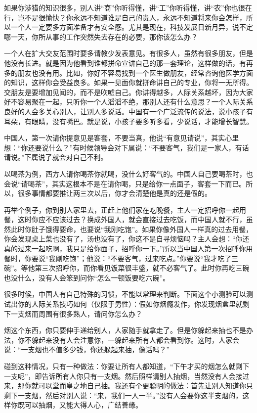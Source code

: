\documentclass[fontset=fandol, a4paper, 12pt, openright]{ctexbook}
\begin{document}
如果你涉猎的知识很多，别人讲“商”你听得懂，讲“工”你听得懂，讲“农”你也很在行，岂不是很愉快？你永远不知道谁是自己的贵人，永远不知道将来你会怎样，所以一个人一定要多方面准备才有安全感。尤其是现在，科技发展日新月异，说不定哪一天，你所从事的工作突然失去存在的必要，那你该怎么办？

一个人在扩大交友范围时要多请教少发表意见。有很多人，虽然有很多朋友，但是他没有长进。就是因为他看到谁都拼命宣讲自己的那一套理论，这样做的话，有再多的朋友也没有用。比如，你好不容易找到一个医生做朋友，经常咨询他医学方面的知识，这样你会受益良多。如果一见面你就拼命讲自己的专业，你将一无所得。交朋友是要增加见闻的，而不是吹嘘自己。你讲得越多，人际关系越坏，因为大家好不容易聚在一起，只听你一个人滔滔不绝，那别人还有什么意思？一个人际关系良好的人会多关心别人，让别人多说话。中国有一个广泛流传的说法，说小孩子有耳朵，有眼睛，没有嘴巴。就是说，小孩子要多听多看，少说话，才能增长智慧。

中国人，第一次请你提意见是客套，不要当真，他说“有意见请说”，其实心里想：“你还要说什么？”有时候领导会对下属说：“不要客气，我们是一家人，有话请说。”下属说了就会对自己不利。

以喝茶为例，西方人请你喝茶你就喝，没什么好客气的。中国人自己要喝茶时，也会说“请喝茶”，其实这根本不是在请你喝，只是给你一点面子，客套一下而已。所以，很多事情都要推让两三次以后，你才会清楚他是真的还是假的。

再举个例子，你到别人家里去，正赶上他们家在吃晚餐，主人一定招呼你一起用餐，这时你应不应该过去？换成外国人，就会直接过去吃饭，而中国人就不行，虽然此时你肚子饿得要命，也要说“我刚吃饱”。如果你像外国人一样真的过去用餐，你会发现桌上菜也没有了，汤也没有了，你这不是自寻烦恼吗？主人会想：“你还真的过来一起吃啊，我只是给你面子，招呼你一下。”所以当中国人第一次招呼你用餐时，你要说“我刚吃饱”；他说：“不要客气，过来吃点。”你要说“我才吃了三碗”。等他第三次招呼你，而你看见饭菜很丰盛，就不必客气了。此时你再吃三碗也没什么，没有人会笨到问你“怎么一顿饭要吃六碗”。

很多时候，中国人有自己特殊的习惯，不能以常理来判断。下面这个小测验可以测试出你的人际关系技巧如何（仅限于男性）：假如你烟瘾发作，你发现烟盒里就剩下一支烟而周围有很多熟人，请问你怎么办？

烟这个东西，你只要伸手递给别人，人家随手就拿走了。但是你躲起来抽也不是办法，你不躲起来没有人会注意你，一躲起来所有人都会看到你。这时，人家会说：“一支烟也不值多少钱，你还躲起来抽，像话吗？”

碰到这种情况，只有一种做法：你要让所有人都知道，“下午才买的烟怎么就剩下一支呢”，即告诉所有人你只有一支烟。然后照样请别人抽烟，当然没有人会接过来，那你就可以堂而皇之地自己抽。我还有个更聪明的做法：首先让别人知道你只剩下一支烟，然后对别人说：“来，我们一人一半。”没有人会要你这半支烟的，这样你既可以抽烟，又能大得人心，广结善缘。
\end{document}
